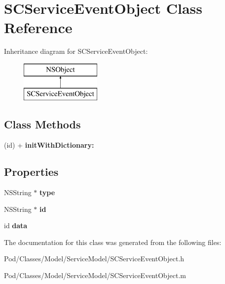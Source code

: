 \hypertarget{interface_s_c_service_event_object}{}\section{S\+C\+Service\+Event\+Object Class Reference}
\label{interface_s_c_service_event_object}
Inheritance diagram for S\+C\+Service\+Event\+Object\+:\begin{figure}[H]
\begin{center}
\leavevmode
\includegraphics[height=2.000000cm]{interface_s_c_service_event_object}
\end{center}
\end{figure}
\subsection*{Class Methods}
\begin{DoxyCompactItemize}
\item 
(id) + {\bfseries init\+With\+Dictionary\+:}\hypertarget{interface_s_c_service_event_object_ab8604bf8f033123b227e28b911d30a14}{}\label{interface_s_c_service_event_object_ab8604bf8f033123b227e28b911d30a14}

\end{DoxyCompactItemize}
\subsection*{Properties}
\begin{DoxyCompactItemize}
\item 
N\+S\+String $\ast$ {\bfseries type}\hypertarget{interface_s_c_service_event_object_a009dd9347e608218bff313ffe6f80f3f}{}\label{interface_s_c_service_event_object_a009dd9347e608218bff313ffe6f80f3f}

\item 
N\+S\+String $\ast$ {\bfseries id}\hypertarget{interface_s_c_service_event_object_aa9c0694a7b50869521fdecf8f1927cb0}{}\label{interface_s_c_service_event_object_aa9c0694a7b50869521fdecf8f1927cb0}

\item 
id {\bfseries data}\hypertarget{interface_s_c_service_event_object_a0e824deca3fca1b6ad874be7cceff9aa}{}\label{interface_s_c_service_event_object_a0e824deca3fca1b6ad874be7cceff9aa}

\end{DoxyCompactItemize}


The documentation for this class was generated from the following files\+:\begin{DoxyCompactItemize}
\item 
Pod/\+Classes/\+Model/\+Service\+Model/S\+C\+Service\+Event\+Object.\+h\item 
Pod/\+Classes/\+Model/\+Service\+Model/S\+C\+Service\+Event\+Object.\+m\end{DoxyCompactItemize}
